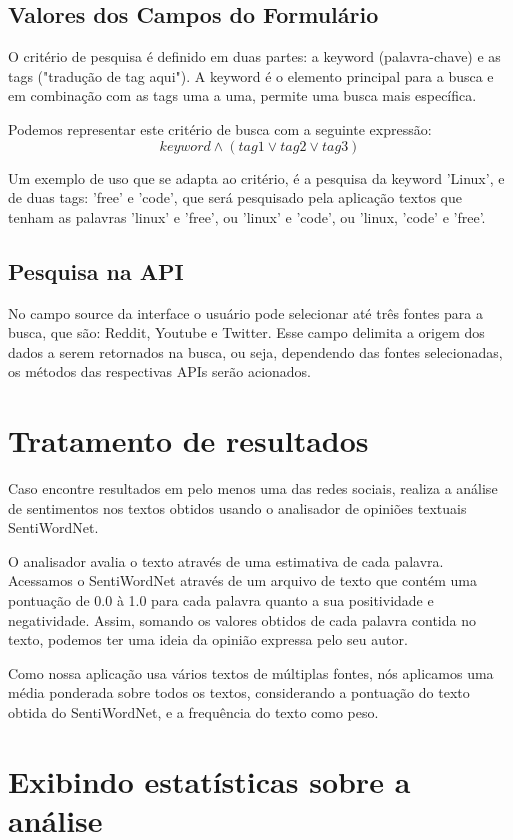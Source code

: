 \subsection{Valores dos Campos do Formulário}
\label{subsec: valoresDosCamposDoFormulario}
O critério de pesquisa é definido em duas partes: a keyword (palavra-chave) e as tags ("tradução de tag aqui"). A keyword é o elemento principal para a busca e em combinação com as tags uma a uma, permite uma busca mais específica.

Podemos representar este critério de busca com a seguinte expressão:
$$keyword \wedge (tag1 \vee tag2 \vee tag3)$$

Um exemplo de uso que se adapta ao critério, é a pesquisa da keyword 'Linux', e de duas tags: 'free' e 'code', que será pesquisado pela aplicação textos que tenham as palavras 'linux' e 'free', ou 'linux' e 'code', ou 'linux, 'code' e 'free'.

\subsection{Pesquisa na API}
\label{subsec: PesquisaNaAPI}
No campo source da interface o usuário pode selecionar até três fontes para a busca, que são: Reddit, Youtube e Twitter. Esse campo delimita a origem dos dados a serem retornados na busca, ou seja, dependendo das fontes selecionadas, os métodos das respectivas APIs serão acionados.

\section{Tratamento de resultados}
\label{sec: TratamentoDeResultados}
Caso encontre resultados em pelo menos uma das redes sociais, realiza a análise de sentimentos nos textos obtidos usando o analisador de opiniões textuais SentiWordNet.

O analisador avalia o texto através de uma estimativa de cada palavra. Acessamos o SentiWordNet através de um arquivo de texto que contém uma pontuação de 0.0 à 1.0 para cada palavra quanto a sua positividade e negatividade.
Assim, somando os valores obtidos de cada palavra contida no texto, podemos ter uma ideia da opinião expressa pelo seu autor.

Como nossa aplicação usa vários textos de múltiplas fontes, nós aplicamos uma média ponderada sobre todos os textos, considerando a pontuação do texto obtida do SentiWordNet, e a frequência do texto como peso.

\section{Exibindo estatísticas sobre a análise}
\label{sec: ExibindoEstatisticas}

